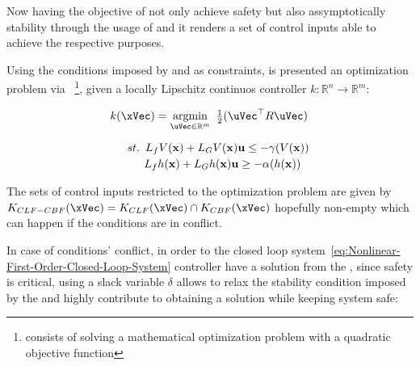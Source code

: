 Now having the objective of not only achieve safety but also assymptotically stability through the usage of  and  it renders a set of control inputs able to achieve the respective purposes.  

Using the conditions imposed by  and  as constraints, is presented an optimization problem  via ~\footnote{ consists of solving a mathematical optimization problem with a quadratic objective function}, given a locally Lipschitz continuos controller \(k: \mathbb{R}^n \rightarrow \mathbb{R}^m \):

\begin{equation}
    \begin{array}{l}
        k(\xVec) = \underset{\uVec \in \mathbb{R}^m }{\mathrm{argmin}} \quad \hspace{-0.5em} \frac{1}{2} (\uVec^\top R \uVec) \vspace{1em} \\  
        \quad \hspace{0.5em}  st. \hspace{0.5em} L_fV(\mathbf{x}) + L_GV(\mathbf{x})\mathbf{u} \leq -\gamma(V(\mathbf{x})) \vspace{0.25em} \\ 
        \quad \quad \hspace{1em} L_fh(\mathbf{x}) + L_Gh(\mathbf{x})\mathbf{u} \geq -\alpha(h(\mathbf{x}))
    \end{array}
 \label{eq:CLF-CBF-QP}
\end{equation}

The sets of control inputs restricted to the optimization problem are given by \(K_{CLF-CBF}(\xVec) = K_{CLF}(\xVec) \cap  K_{CBF}(\xVec)\) hopefully non-empty which can happen if the conditions are in conflict. \par

In case of conditions' conflict, in order to the closed loop system~\ref{eq:Nonlinear-First-Order-Closed-Loop-System} controller have a solution from the , since safety is critical, using a slack variable \(\delta\)  allows to relax the stability condition imposed by the  and highly contribute to obtaining a solution while keeping system safe:


